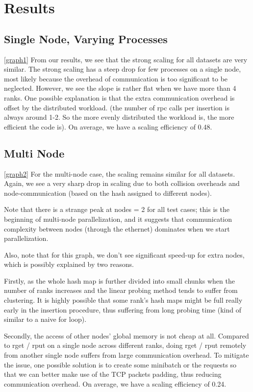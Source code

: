 \documentclass[12pt]{article}
\begin{document}
\section{Results}

\subsection{Single Node, Varying Processes}
\ref{graph1}
From our results, we see that the strong scaling for all datasets are very similar. The strong scaling has a steep drop for few processes on a single node, most likely because the overhead of communication is too significant to be neglected. However, we see the slope is rather flat when we have more than 4 ranks. One possible explanation is that the extra communication overhead is offset by the distributed workload. (the number of rpc calls per insertion is always around 1-2. So the more evenly distributed the workload is, the more efficient the code is). 
On average, we have a scaling efficiency of 0.48.
\subsection{Multi Node}
\ref{graph2} For the multi-node case, the scaling remains similar for all datasets. Again, we see a very sharp drop in scaling due to both collision overheads and node-communication (based on the hash assigned to different nodes). 

Note that there is a strange peak at nodes = 2 for all test cases; this is the beginning of multi-node parallelization, and it suggests that communication complexity between nodes (through the ethernet) dominates when we start parallelization. 

Also, note that for this graph, we don't see significant speed-up for extra nodes, which is possibly explained by two reasons.

Firstly, as the whole hash map is further divided into small chunks when the number of ranks increases and the linear probing method tends to suffer from clustering. It is highly possible that some rank's hash maps might be full really early in the insertion procedure, thus suffering from long probing time (kind of similar to a naive for loop).

Secondly, the access of other nodes' global memory is not cheap at all. Compared to rget / rput on a single node across different ranks, doing rget / rput remotely from another single node suffers from large communication overhead. To mitigate the issue, one possible solution is to create some minibatch or the requests so that we can better make use of the TCP packets padding, thus reducing communication overhead.
On average, we have a scaling efficiency of 0.24.
\end{document}
